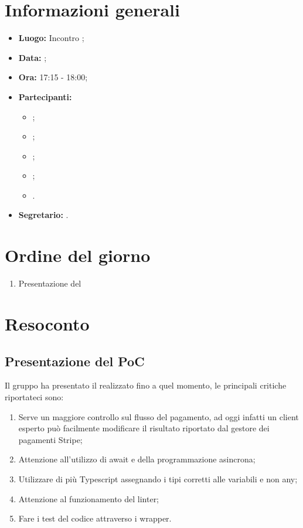 \section{Informazioni generali}
\begin{itemize}
\item \textbf{Luogo:} Incontro ;
\item \textbf{Data:} \Data;
\item \textbf{Ora:} 17:15 - 18:00;
\item \textbf{Partecipanti:}
	\begin{itemize}
		\item \BL{}; 
		\item \FF{};
		\item \MM{};
		\item \TG{};
		\item \Proponente{}.
	\end{itemize}
\item \textbf{Segretario:} \TG{}.
\end{itemize}

\section{Ordine del giorno}
\begin{enumerate}
	\item Presentazione del 
\end{enumerate}

\section{Resoconto}
\subsection{Presentazione del PoC}
Il gruppo ha presentato il  realizzato fino a quel momento, le principali critiche riportateci sono:
\begin{enumerate}
	\item Serve un maggiore controllo sul flusso del pagamento, ad oggi infatti un client esperto può facilmente modificare il risultato riportato dal gestore dei pagamenti Stripe;
	\item Attenzione all'utilizzo di await e della programmazione asincrona;
	\item Utilizzare di più Typescript assegnando i tipi corretti alle variabili e non any;
	\item Attenzione al funzionamento del linter;
	\item Fare i test del codice attraverso i wrapper.
\end{enumerate}

